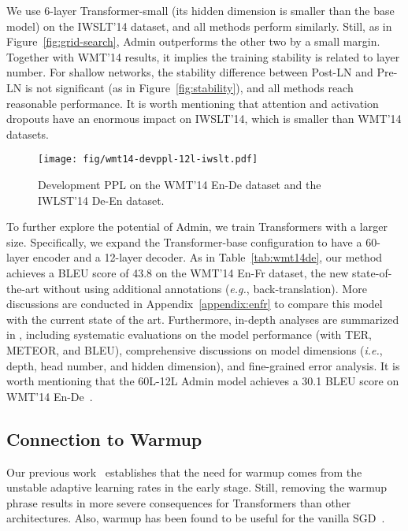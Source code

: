 \documentclass[11pt,a4paper]{article}
\newcommand{\our}{\mbox{Admin}\xspace}
\newcommand{\eg}{\textit{e.g.}}
\newcommand{\ie}{\textit{i.e.}}
\begin{document}
We use 6-layer Transformer-small (its hidden dimension is smaller than the base model) on the IWSLT'14 dataset, and all methods perform similarly.
Still, as in Figure~\ref{fig:grid-search}, Admin outperforms the other two by a small margin. 
Together with WMT'14 results, it implies the training stability is related to layer number. 
For shallow networks, the stability difference between Post-LN and Pre-LN is not significant (as in Figure~\ref{fig:stability}), and all methods reach reasonable performance. 
It is worth mentioning that attention and activation dropouts have an enormous impact on IWSLT'14, which is smaller than WMT'14 datasets. 


\begin{figure}[t]
\centering
\texttt{[image: fig/wmt14-devppl-12l-iwslt.pdf]}
\caption{
Development PPL on the WMT'14 En-De dataset and the IWLST'14 De-En dataset. }
\label{fig:wmt14-devppl-12l-iwslt}
\end{figure}

To further explore the potential of \our, we train Transformers with a larger size. 
Specifically, we expand the Transformer-base configuration to have a 60-layer encoder and a 12-layer decoder. 
As in Table~\ref{tab:wmt14de}, our method achieves a BLEU score of 43.8 on the WMT'14 En-Fr dataset, the new state-of-the-art without using additional annotations (\eg, back-translation).
More discussions are conducted in Appendix~\ref{appendix:enfr} to compare this model with the current state of the art. 
Furthermore, in-depth analyses are summarized in \citet{Liu2020VeryDT}, including systematic evaluations on the model performance (with TER, METEOR, and BLEU), comprehensive discussions on model dimensions (\ie, depth, head number, and hidden dimension), and fine-grained error analysis.
It is worth mentioning that the 60L-12L Admin model achieves a 30.1 BLEU score on WMT'14 En-De~\cite{Liu2020VeryDT}. 









\subsection{Connection to Warmup}
\label{subsec:warmup}

Our previous work~\cite{Liu2019OnTV} establishes that the need for warmup comes from the unstable adaptive learning rates in the early stage.
Still, removing the warmup phrase results in more severe consequences for Transformers than other architectures.
Also, warmup has been found to be useful for the vanilla SGD~\cite{Xiong2019OnLN}.
\end{document}
